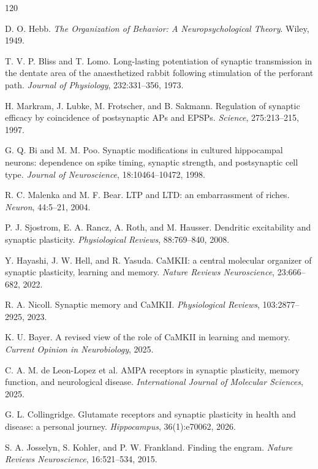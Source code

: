 \documentclass[11pt]{article}
\newcommand{\1}{\mathbf{1}}
\begin{document}
\newpage
\begin{thebibliography}{120}

D. O. Hebb. \emph{The Organization of Behavior: A Neuropsychological Theory}. Wiley, 1949.

T. V. P. Bliss and T. Lomo. Long-lasting potentiation of synaptic transmission in the dentate area of the anaesthetized rabbit following stimulation of the perforant path. \emph{Journal of Physiology}, 232:331--356, 1973.

H. Markram, J. Lubke, M. Frotscher, and B. Sakmann. Regulation of synaptic efficacy by coincidence of postsynaptic APs and EPSPs. \emph{Science}, 275:213--215, 1997.

G. Q. Bi and M. M. Poo. Synaptic modifications in cultured hippocampal neurons: dependence on spike timing, synaptic strength, and postsynaptic cell type. \emph{Journal of Neuroscience}, 18:10464--10472, 1998.

R. C. Malenka and M. F. Bear. LTP and LTD: an embarrassment of riches. \emph{Neuron}, 44:5--21, 2004.

P. J. Sjostrom, E. A. Rancz, A. Roth, and M. Hausser. Dendritic excitability and synaptic plasticity. \emph{Physiological Reviews}, 88:769--840, 2008.

Y. Hayashi, J. W. Hell, and R. Yasuda. CaMKII: a central molecular organizer of synaptic plasticity, learning and memory. \emph{Nature Reviews Neuroscience}, 23:666--682, 2022.

R. A. Nicoll. Synaptic memory and CaMKII. \emph{Physiological Reviews}, 103:2877--2925, 2023.

K. U. Bayer. A revised view of the role of CaMKII in learning and memory. \emph{Current Opinion in Neurobiology}, 2025.

C. A. M. de Leon-Lopez et al. AMPA receptors in synaptic plasticity, memory function, and neurological disease. \emph{International Journal of Molecular Sciences}, 2025.

G. L. Collingridge. Glutamate receptors and synaptic plasticity in health and disease: a personal journey. \emph{Hippocampus}, 36(1):e70062, 2026.

S. A. Josselyn, S. Kohler, and P. W. Frankland. Finding the engram. \emph{Nature Reviews Neuroscience}, 16:521--534, 2015.


\end{thebibliography}
\end{document}

